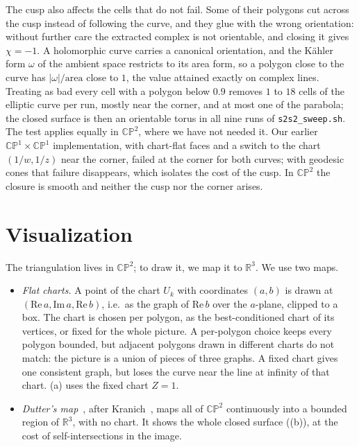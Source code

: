 \documentclass[11pt]{article}
\theoremstyle{plain}
\theoremstyle{definition}
\theoremstyle{remark}
\newcommand{\CP}{\mathbb{CP}}
\newcommand{\R}{\mathbb{R}}
\begin{document}
The cusp also affects the cells that do not fail. Some of their polygons
cut across the cusp instead of following the curve, and they glue with
the wrong orientation: without further care the extracted complex is not
orientable, and closing it gives $\chi=-1$. A holomorphic curve carries a
canonical orientation, and the Kähler form $\omega$ of the ambient space
restricts to its area form, so a polygon close to the curve has
$|\omega|/\mathrm{area}$ close to $1$, the value attained exactly on
complex lines. Treating as bad every cell with a polygon below $0.9$
removes $1$ to $18$ cells of the elliptic curve per run, mostly near the
corner, and at most one of the parabola; the closed surface is then an
orientable torus in all nine runs of \texttt{s2s2\_sweep.sh}. The test
applies equally in $\CP^2$, where we have not needed it. Our earlier $\CP^1\times\CP^1$ implementation, with
chart-flat faces and a switch to the chart $(1/w,1/z)$ near the corner,
failed at the corner for both curves; with geodesic cones that failure
disappears, which isolates the cost of the cusp. In $\CP^2$ the closure is
smooth and neither the cusp nor the corner arises.

\section{Visualization}
\label{sec:viz}

The triangulation lives in $\CP^2$; to draw it, we map it to $\R^3$.
We use two maps.
\begin{itemize}[itemsep=2pt]
\item \emph{Flat charts.} A point of the chart $U_k$ with coordinates
  $(a,b)$ is drawn at $(\mathrm{Re}\,a,\mathrm{Im}\,a,\mathrm{Re}\,b)$,
  i.e.\ as the graph of $\mathrm{Re}\,b$ over the $a$-plane, clipped to a
  box. The chart is chosen per polygon, as the best-conditioned chart
  of its vertices, or fixed for the whole picture. A per-polygon choice
  keeps every polygon bounded, but adjacent polygons drawn in different
  charts do not match: the picture is a union of pieces of three graphs.
  A fixed chart gives one consistent graph, but loses the curve near the
  line at infinity of that chart. (a) uses the fixed
  chart $Z=1$.
\item \emph{Dutter's map}~\cite{dutter2026}, after
  Kranich~\cite{kranich2016}, maps all of $\CP^2$ continuously into a
  bounded region of $\R^3$, with no chart. It shows the whole closed
  surface ((b)), at the cost of self-intersections in
  the image.
\end{itemize}
\end{document}
